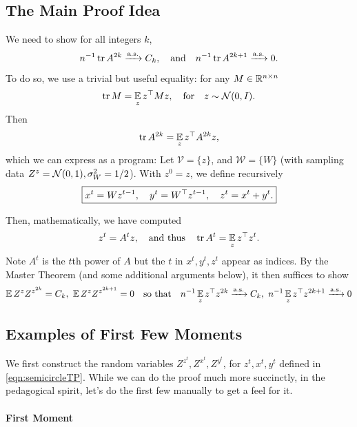 \documentclass[main.tex]{subfiles}
\begin{document}
\subsection{The Main Proof Idea}

\newcommand{\semicirc}{\put(2.5,2){\oval(4,4)[t]}\put(0.5, 1.9){\line(1,0){4}}\phantom{\circ}}

We need to show for all integers $k$,
\[
{n}^{-1} \operatorname{tr} A^{2k}\xrightarrow{\mathrm{a.s.}} C_{k},\quad\text{and}\quad{n}^{-1} \operatorname{tr} A^{2k+1}\xrightarrow{\mathrm{a.s.}}0.
\]
To do so, we use a trivial but useful equality: for any $M\in\mathbb{R}^{n\times n}$
\begin{equation}
\tr M=\EV_z z^{\trsp}Mz,\quad\text{for}\quad z\sim\Gaus(0,I).
\label{eqn:zdef}
\end{equation}
Then
\[
\operatorname{tr} A^{2k}=\operatorname*{\mathbb{E}}_z z^{\top}A^{2k}z,
\]
which we can express as a \netsort{} program: Let $\mathcal V=\{z\}$, and $\mathcal W = \{W\}$ (with sampling data $Z^{z}=\mathcal{N}(0,1), \sigma_W^2 = 1/2$).
With $z^{0}=z$, we define recursively
\begin{equation}
\boxed{x^{t}=Wz^{t-1},\quad y^{t}=W^{\trsp}z^{t-1},\quad z^t=x^{t}+y^{t}.}
\label{eqn:semicircleTP}
\end{equation}

Then, mathematically, we have computed
\[
z^{t}=A^{t}z,\quad\text{and thus}\quad\operatorname{tr} A^{t}=\operatorname*{\mathbb{E}}_z z^{\top}z^{t}.
\]
Note $A^t$ is the $t$th power of $A$ but the $t$ in $x^t, y^t, z^t$ appear as indices.
By the Master Theorem (and some additional arguments below), it then suffices to show
\begin{align*}
    \EV Z^z Z^{z^{2k}} = C_k,\ \EV Z^z Z^{z^{2k+1}}=0
    \quad \text{so that}\quad
    \inv{n}\EV_z z^{\trsp}z^{2k}\asto C_{k},\ 
    \inv{n}\EV_z z^{\trsp}z^{2k+1}\asto0
\end{align*}

\subsection{Examples of First Few Moments}

We first construct the random variables $Z^{z^{t}},Z^{x^{t}},Z^{y^{t}}$, for $z^t, x^t, y^t$ defined in \cref{eqn:semicircleTP}. While we can do the proof much more succinctly, in the pedagogical spirit, let's do the first few manually to get a feel for it. 

\paragraph*{First Moment}
\end{document}
